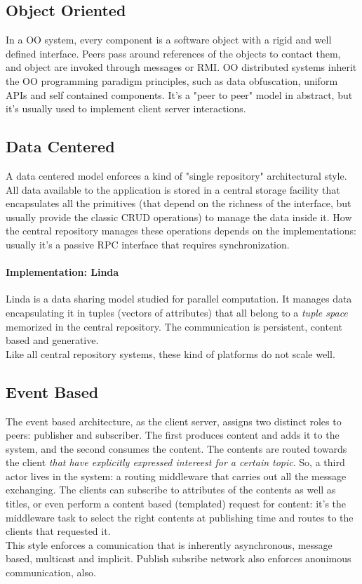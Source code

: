 \documentclass[10pt,a4paper]{article}
\begin{document}
			\subsection{Object Oriented}
				In a OO system, every component is a software object with a rigid and well defined interface. Peers pass around references of the objects to contact them, and object are invoked through messages or RMI. OO distributed systems inherit the OO programming paradigm principles, such as data obfuscation, uniform APIs and self contained components. It's a "peer to peer" model in abstract, but it's usually used to implement client server interactions. 

			\subsection{Data Centered}
				A data centered model enforces a kind of "single repository" architectural style. All data available to the application is stored in a central storage facility that encapsulates all the primitives (that depend on the richness of the interface, but usually provide the classic CRUD operations) to manage the data inside it. How the central repository manages these operations depends on the implementations: usually it's a passive RPC interface that requires synchronization. 
				
				\paragraph{Implementation: Linda}
					Linda is a data sharing model studied for parallel computation. It manages data encapsulating it in tuples (vectors of attributes) that all belong to a \emph{tuple space} memorized in the central repository. The communication is persistent, content based and generative.\\
					Like all central repository systems, these kind of platforms do not scale well.
					
			\subsection{Event Based}
				The event based architecture, as the client server, assigns two distinct roles to peers: publisher and subscriber. The first produces content and adds it to the system, and the second consumes the content. The contents are routed towards the client \emph{that have explicitly expressed intereest for a certain topic}. So, a third actor lives in the system: a routing middleware that carries out all the message exchanging. The clients can subscribe to attributes of the contents as well as titles, or even perform a content based (templated) request for content: it's the middleware task to select the right contents at publishing time and routes to the clients that requested it.\\
				This style enforces a comunication that is inherently asynchronous, message based, multicast and implicit. Publish subsribe network also enforces anonimous communication, also. 
			
\end{document}

